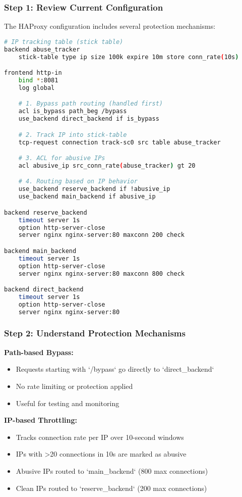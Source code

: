 \documentclass[12pt]{article}
\begin{document}
\subsubsection{Step 1: Review Current Configuration}
The HAProxy configuration includes several protection mechanisms:

\begin{lstlisting}[language=bash, caption=HAProxy Configuration]
# IP tracking table (stick table)
backend abuse_tracker
    stick-table type ip size 100k expire 10m store conn_rate(10s)

frontend http-in
    bind *:8081
    log global

    # 1. Bypass path routing (handled first)
    acl is_bypass path_beg /bypass
    use_backend direct_backend if is_bypass

    # 2. Track IP into stick-table
    tcp-request connection track-sc0 src table abuse_tracker

    # 3. ACL for abusive IPs
    acl abusive_ip src_conn_rate(abuse_tracker) gt 20

    # 4. Routing based on IP behavior
    use_backend reserve_backend if !abusive_ip
    use_backend main_backend if abusive_ip

backend reserve_backend
    timeout server 1s
    option http-server-close
    server nginx nginx-server:80 maxconn 200 check

backend main_backend
    timeout server 1s
    option http-server-close
    server nginx nginx-server:80 maxconn 800 check

backend direct_backend
    timeout server 1s
    option http-server-close
    server nginx nginx-server:80
\end{lstlisting}

\subsubsection{Step 2: Understand Protection Mechanisms}

\textbf{Path-based Bypass:}
\begin{itemize}
    \item Requests starting with `/bypass` go directly to `direct_backend`
    \item No rate limiting or protection applied
    \item Useful for testing and monitoring
\end{itemize}

\textbf{IP-based Throttling:}
\begin{itemize}
    \item Tracks connection rate per IP over 10-second windows
    \item IPs with >20 connections in 10s are marked as abusive
    \item Abusive IPs routed to `main_backend` (800 max connections)
    \item Clean IPs routed to `reserve_backend` (200 max connections)
\end{itemize}
\end{document}
